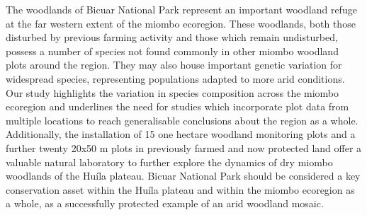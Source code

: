 \begin{refsection}
The woodlands of Bicuar National Park represent an important woodland refuge at the far western extent of the miombo ecoregion. These woodlands, both those disturbed by previous farming activity and those which remain undisturbed, possess a number of species not found commonly in other miombo woodland plots around the region. They may also house important genetic variation for widespread species, representing populations adapted to more arid conditions. Our study highlights the variation in species composition across the miombo ecoregion and underlines the need for studies which incorporate plot data from multiple locations to reach generalisable conclusions about the region as a whole. Additionally, the installation of 15 one hectare woodland monitoring plots and a further twenty 20x50 m plots in previously farmed and now protected land offer a valuable natural laboratory to further explore the dynamics of dry miombo woodlands of the Hu\'{i}la plateau. Bicuar National Park should be considered a key conservation asset within the Hu\'{i}la plateau and within the miombo ecoregion as a whole, as a successfully protected example of an arid woodland mosaic.


\newpage{}
\begingroup
{}
\printbibliography[heading=subbibintoc]
\endgroup

\end{refsection}

